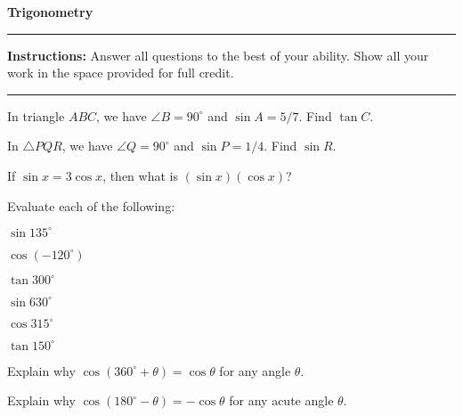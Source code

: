 \documentclass[12pt]{exam}
\newcommand{\examtitle}{Trigonometry}
\newcommand{\instructions}{
    \noindent\rule{\textwidth}{0.5pt}
    \begin{center}
    \textbf{Instructions:} Answer all questions to the best of your ability. Show all your work in the space provided for full credit.
    \end{center}
    \noindent\rule{\textwidth}{0.5pt}
}
\begin{document}
\begin{center}
\textbf{\Large \examtitle} \\
\vspace{0.5cm}
\hspace{0.1\textwidth}
\end{center}

\instructions
\vspace{0.5cm}

\begin{questions}

\pointsinrightmargin

\question[8]
In triangle $ABC$, we have $\angle B = 90^\circ$ and $\sin A = 5/7$. Find $\tan C$.
\vspace*{4cm}

\question[8]
In $\triangle PQR$, we have $\angle Q = 90^\circ$ and $\sin P = 1/4$. Find $\sin R$.
\vspace*{4cm}

\question[8]
If $\sin x = 3 \cos x$, then what is $(\sin x)(\cos x)$?
\vspace*{4cm}

\newpage

\question[12]
Evaluate each of the following:
\begin{parts}
    \item $\sin 135^\circ$
    \vspace*{3cm}
    \item $\cos(-120^\circ)$
    \vspace*{3cm}
    \item $\tan 300^\circ$
    \vspace*{3cm}
    \newpage
    \item $\sin 630^\circ$
    \vspace*{3cm}
    \item $\cos 315^\circ$
    \vspace*{3cm}
    \item $\tan 150^\circ$
    \vspace*{3cm}
\end{parts}

\newpage

\question[8]
Explain why $\cos(360^\circ + \theta) = \cos \theta$ for any angle $\theta$.
\vspace*{4cm}

\question[8]
Explain why $\cos(180^\circ - \theta) = -\cos \theta$ for any acute angle $\theta$.
\vspace*{4cm}


\end{questions}
\end{document}
